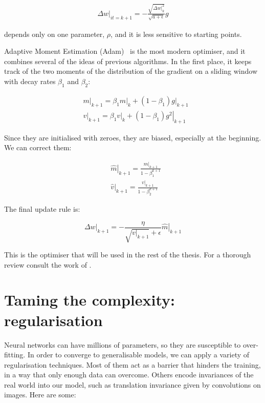 \begin{align*}
\left.\Delta w\right|_{it=k+1} = - \frac{\sqrt{\left.\Delta w\right|_{k}^2}}{\sqrt{a + \epsilon}}g 
\end{align*}

\ADADELTA{} depends only on one parameter, $\rho$, and it is less sensitive to starting points.

Adaptive Moment Estimation (Adam)~\citep{adam} is the most modern optimiser, 
and it combines several of the ideas of previous algorithms.
In the first place, it keeps track of the two moments of the distribution of the gradient on a sliding window with decay rates $\beta_1$ and $\beta_2$:

\begin{align*}
&\left.m\right|_{k+1} = \beta_1 \left.m\right|_k + (1-\beta_1) \left.g\right|_{k+1}\\
&\left.v\right|_{k+1} = \beta_1 \left.v\right|_k + (1-\beta_1) \left.g^2\right|_{k+1}
\end{align*}

Since they are initialised with zeroes, they are biased, especially at the beginning. We can correct them:

\begin{align*}
	&\left.\hat{m}\right|_{k+1} = \frac{\left.m\right|_{k+1}}{1-\beta_1^{k+1}}\\
	&\left.\hat{v}\right|_{k+1} = \frac{\left.v\right|_{k+1}}{1-\beta_2^{k+1}}
\end{align*}

The final update rule is:

\begin{equation*}
\left.\Delta w\right|_{k+1} = - \frac{\eta}{\sqrt{\left.v\right|_{k+1}} + \epsilon}\left.\hat{m}\right|_{k+1}
\end{equation*} 

This is the optimiser that will be used in the rest of the thesis.
For a thorough review consult the work of \citet{optimisers_review}.


\section{Taming the complexity: regularisation}
Neural networks can have millions of parameters, so they are susceptible to over-fitting.
In order to converge to generalisable models, we can apply a variety of regularisation techniques.
Most of them act as a barrier that hinders the training, in a way that only enough data can overcome.
Others encode invariances of the real world into our model, such as translation invariance given by convolutions on images.
Here are some:


